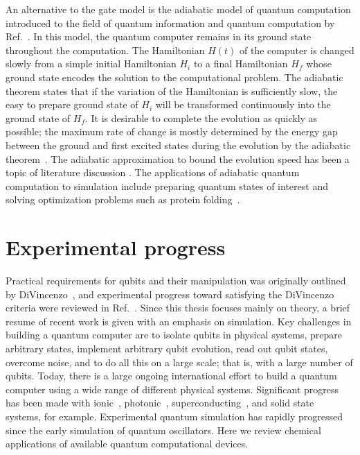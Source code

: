 \documentclass[11pt,oneside,final]{huthesis}%
\begin{document}
An alternative to the gate model is the adiabatic model of quantum computation introduced to the field of quantum information and quantum computation by Ref.~\cite{Farhi01}. %
In this model, the quantum computer remains in its ground
state throughout the computation. The Hamiltonian $H(t)$ of the computer is
changed slowly from a simple initial Hamiltonian $H_i$ to a final Hamiltonian
$H_f$ whose ground state encodes the solution to the computational problem. The
adiabatic theorem states that if the variation of the Hamiltonian is
sufficiently slow, the easy to prepare ground state of $H_i$ will be transformed
continuously into the ground state of $H_f$.  It is desirable to complete the
evolution as quickly as possible; the maximum rate of change is mostly
determined by the energy gap between the ground and first excited states during
the evolution by the adiabatic theorem~\cite{Messiah99}.  The adiabatic approximation
to bound the evolution speed has been a topic of literature 
discussion \cite{Amin09B,Tong07,Tong10,Boixo10}. The applications of adiabatic quantum computation to
simulation include preparing quantum states of interest and solving optimization
problems such as protein folding~\cite{Perdomo08}. %


\section{Experimental progress}\label{sec:expt}

Practical requirements for qubits and their manipulation was originally outlined by DiVincenzo~\cite{DiVincenzo00}, and experimental progress toward satisfying the DiVincenzo criteria {were} reviewed in Ref.~\cite{Ladd10}. Since this thesis focuses mainly on theory, a brief resume of recent work is given with an emphasis on simulation.
Key challenges in building a quantum computer are to isolate
qubits in physical systems, prepare arbitrary states, implement arbitrary
qubit evolution, read out qubit states, overcome noise, and to
do all this on a large scale; that is, with a large number of qubits.
Today, there is a large ongoing international effort to build a
quantum computer using a wide range of different physical systems.
Significant progress has been made with ionic~\cite{Schmidt-Kaler03, Leibfried03}, 
photonic~\cite{Obrien03},
superconducting~\cite{Plantenberg07}, and solid state~\cite{Pashkin03} systems, for 
example.
Experimental quantum simulation has rapidly progressed
\cite{Buluta09,Brown10} since the early simulation of quantum oscillators.
Here we review chemical applications of available quantum computational devices.
\end{document}
